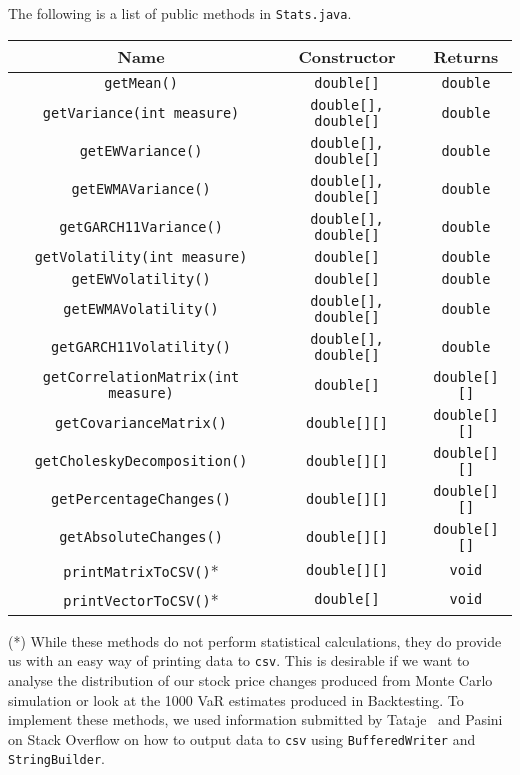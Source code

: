 \documentclass[../Dissertation.tex]{subfiles}
\begin{document}
The following is a list of public methods in \lstinline|Stats.java|. 
\begin{center}
\begin{tabular}{||c | c | c ||} 
\hline
Name & Constructor & Returns \\ [0.5ex] 
\hline\hline
\lstinline|getMean()| & \lstinline|double[]| & \lstinline|double|\\ 
\hline
\lstinline|getVariance(int measure)| & \lstinline|double[], double[]| & \lstinline|double| \\
\hline
\lstinline|getEWVariance()| & \lstinline|double[], double[]| & \lstinline|double| \\
\hline
\lstinline|getEWMAVariance()| & \lstinline|double[], double[]| & \lstinline|double|\\
\hline
\lstinline|getGARCH11Variance()| & \lstinline|double[], double[]| & \lstinline|double|\\
\hline
\lstinline|getVolatility(int measure)| & \lstinline|double[]| & \lstinline|double|\\
\hline
\lstinline|getEWVolatility()| & \lstinline|double[]| & \lstinline|double|\\
\hline
\lstinline|getEWMAVolatility()| & \lstinline|double[], double[]| & \lstinline|double|\\
\hline
\lstinline|getGARCH11Volatility()| & \lstinline|double[], double[]| & \lstinline|double|\\
\hline
\lstinline|getCorrelationMatrix(int measure)| & \lstinline|double[]| & \lstinline|double[][]|\\
\hline
\lstinline|getCovarianceMatrix()| & \lstinline|double[][]| & \lstinline|double[][]|\\
\hline
\lstinline|getCholeskyDecomposition()| & \lstinline|double[][]| & \lstinline|double[][]|\\
\hline
\lstinline|getPercentageChanges()| &\lstinline|double[][]| & \lstinline|double[][]|\\
\hline
\lstinline|getAbsoluteChanges()| & \lstinline|double[][]| & \lstinline|double[][]|\\
\hline
\lstinline|printMatrixToCSV()|* &\lstinline|double[][]| & \lstinline|void|\\
\hline
\lstinline|printVectorToCSV()|* & \lstinline|double[]| & \lstinline|void|\\[1ex] 
\hline
\end{tabular}
\end{center}
(*) While these methods do not perform statistical calculations, they do provide us with an easy way of printing data to \lstinline|csv|.
This is desirable if we want to analyse the distribution of our stock price changes produced from Monte Carlo simulation or look at the 1000 VaR estimates produced in Backtesting.
To implement these methods, we used information submitted by Tataje~\cite{Tataje:2013} and Pasini~\cite{Pasini:2016} on Stack Overflow on how to output data to \lstinline|csv| using \lstinline|BufferedWriter| and \lstinline|StringBuilder|.
\end{document}

